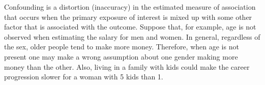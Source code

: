 \documentclass{article}
\begin{document}
Confounding is a distortion (inaccuracy) in the estimated measure of association that occurs when the primary exposure of interest is mixed up with some other factor that is associated with the outcome. Suppose that, for example, age is not observed when estimating the salary for men and women. In general, regardless of the sex, older people tend to make more money. Therefore, when age is not present one may make a wrong assumption about one gender making more money than the other. Also, living in a family with kids could make the career progression slower for a woman with 5 kids than 1.
\end{document}

